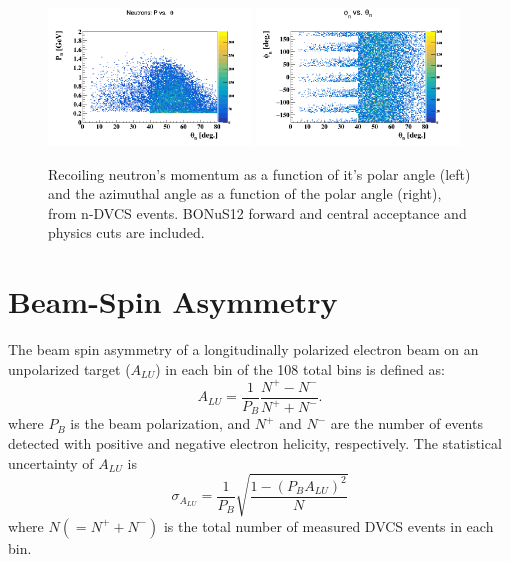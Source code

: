 \begin{figure}[htb]
\centering
  \includegraphics[width=0.48\textwidth,clip,trim=0mm 0mm 0mm 
   20mm]{figs/n_p_theta.png}
\includegraphics[width=0.48\textwidth,clip,trim=0mm 0mm 0mm 
   20mm]{figs/n_phi_theta.png}
  \caption{Recoiling neutron's momentum as a function of it's polar angle 
  (left) and the azimuthal angle as a function of the polar angle (right), from 
   n-DVCS events. BONuS12 forward and central acceptance and physics cuts are 
   included.}
  \label{fig:neutron_kin}
\end{figure}


\section{Beam-Spin Asymmetry}

The beam spin asymmetry of a longitudinally polarized electron beam on an 
unpolarized target ($A_{LU}$) in each bin of the 108 total bins is defined as:
%
\begin{equation}
  A_{LU} = \frac{1}{P_{B}} \frac{N^{+} - N^{-}}{N^{+} + N^{-} }.
\end{equation}
%
where $P_{B}$ is the beam polarization, and $N^{+}$ and $N^{-}$ are the number 
of events detected with positive and negative electron helicity, respectively.  
The statistical uncertainty of $A_{LU}$ is
%
\begin{equation}
  \sigma_{A_{LU}} = \frac{1}{P_{B}} \sqrt{ \frac{1 - (P_{B}A_{LU})^{2}}{N}}
\end{equation}
%
where $N (= N^{+} + N^{-}) $ is the total number of measured DVCS events in 
each bin.

